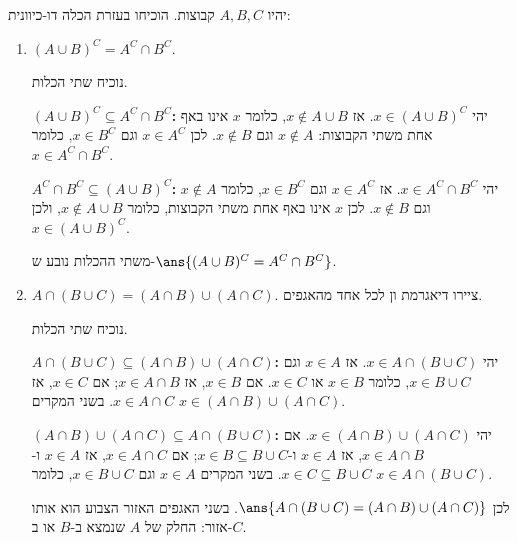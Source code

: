יהיו $A,B,C$ קבוצות. הוכיחו בעזרת הכלה דו-כיוונית:
\begin{enumerate}
\item $(A\cup B)^C=A^C\cap B^C$.
\begin{solbox}
נוכיח שתי הכלות.

\textbf{$(A\cup B)^C\subseteq A^C\cap B^C$:} יהי $x\in(A\cup B)^C$. אז $x\notin A\cup B$, כלומר $x$ אינו באף אחת משתי הקבוצות: $x\notin A$ וגם $x\notin B$. לכן $x\in A^C$ וגם $x\in B^C$, כלומר $x\in A^C\cap B^C$.

\textbf{$A^C\cap B^C\subseteq(A\cup B)^C$:} יהי $x\in A^C\cap B^C$. אז $x\in A^C$ וגם $x\in B^C$, כלומר $x\notin A$ וגם $x\notin B$. לכן $x$ אינו באף אחת משתי הקבוצות, כלומר $x\notin A\cup B$, ולכן $x\in(A\cup B)^C$.

משתי ההכלות נובע ש-$\ans{(A\cup B)^C=A^C\cap B^C}$.
\end{solbox}
\item $A\cap(B\cup C)=(A\cap B)\cup(A\cap C)$. ציירו דיאגרמת ון לכל אחד מהאגפים.
\begin{solbox}
נוכיח שתי הכלות.

\textbf{$A\cap(B\cup C)\subseteq(A\cap B)\cup(A\cap C)$:} יהי $x\in A\cap(B\cup C)$. אז $x\in A$ וגם $x\in B\cup C$, כלומר $x\in B$ או $x\in C$. אם $x\in B$, אז $x\in A\cap B$; אם $x\in C$, אז $x\in A\cap C$. בשני המקרים $x\in(A\cap B)\cup(A\cap C)$.

\textbf{$(A\cap B)\cup(A\cap C)\subseteq A\cap(B\cup C)$:} יהי $x\in(A\cap B)\cup(A\cap C)$. אם $x\in A\cap B$, אז $x\in A$ ו-$x\in B\subseteq B\cup C$; אם $x\in A\cap C$, אז $x\in A$ ו-$x\in C\subseteq B\cup C$. בשני המקרים $x\in A$ וגם $x\in B\cup C$, כלומר $x\in A\cap(B\cup C)$.

לכן $\ans{A\cap(B\cup C)=(A\cap B)\cup(A\cap C)}$. בשני האגפים האזור הצבוע הוא אותו אזור: החלק של $A$ שנמצא ב-$B$ או ב-$C$.

\begin{center}
\qquad
{}
\end{center}
\end{solbox}
\end{enumerate}

